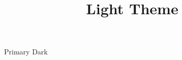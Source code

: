 \documentclass[theme=light]{SUSTechHomework}
\title{Light Theme}
\begin{document}
\maketitle
\textcolor{SUSTechPrimary}{Primary} \textcolor{SUSTechDark}{Dark}
\end{document}

